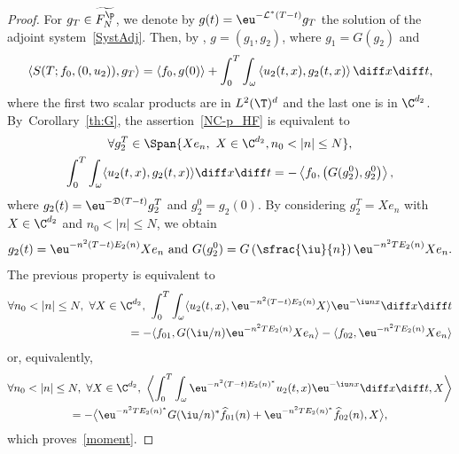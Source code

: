 \begin{proof}
For $g_T \in \widetilde{F^\p_N}$, we denote by $g(t)=\eu^{-\mathcal{L}^*(T-t)}g_T$ the solution of the adjoint system~\eqref{SystAdj}. Then, by , $g=(g_1,g_2)$, where $g_1=G(g_2)$ and
\[
\left\langle S(T;f_0,(0,u_2)), g_T \right\rangle = \left\langle f_0, g(0) \right\rangle + \int_0^T \int_{\omega} \left\langle u_2(t,x), g_2(t,x) \right\rangle \diff x \diff t,
\]
where the first two scalar products are in $L^2(\T)^{d}$ and the last one is in $\C^{d_2}$.
By~Corollary~\ref{th:G}, the assertion~\eqref{NC-p_HF} is equivalent to
\begin{multline}
\forall g_{2}^T \in \Span\{X e_n,\ X\in\C^{d_2}, n_0<|n|\leq N\},\\
\int_0^T \int_{\omega} \langle u_2(t,x), g_2(t,x) \rangle \diff x \diff t = -
\left\langle f_0, \left(G(g_2^0),g_2^0\right) \right\rangle,\end{multline}
where $g_2(t)=\eu^{-\mathfrak{D}(T-t)} g_2^T$ and $g_2^0=g_2(0)$.
By considering $g_2^T = X e_n$ with $X \in \C^{d_2}$ and $n_0 < |n|\leq N$, we obtain
\[
g_2(t)=\eu^{-n^2(T-t)E_2(n)} X e_n \text{ and }
G(g_2^0)=G\left(\sfrac{\iu}{n}\right)\eu^{-n^2 T E_2(n)} X e_n.
\]
The previous property is equivalent to
\begin{align*}
\forall n_0 < |n|\leq N,\ \forall X \in \C^{d_2}, \
\int_0^T \int_{\omega} \langle u_2(t,x), \eu^{-n^2(T-t)E_2(n)} X \rangle \eu^{-\iu nx} \diff x \diff t \\
= -
\langle f_{01}, G(\iu /n)\eu^{-n^2 T E_2(n)} X e_n \rangle - \langle f_{02}, \eu^{-n^2 T E_2(n)} X e_n \rangle
\end{align*}
or, equivalently,
\begin{multline*}
\forall n_0 < |n|\leq N,\ \forall X \in \C^{d_2}, \
\biggl\langle \int_0^T \int_{\omega} \eu^{-n^2(T-t)E_2(n)^*} u_2(t,x) \eu^{-\iu nx} \diff x \diff t, X \biggr\rangle\\
= -
\bigl\langle \eu^{-n^2 T E_2(n)^*} G(\iu /n)^* \widehat{f}_{01}(n) + \eu^{-n^2 T E_2(n)^*} \widehat{f}_{02}(n), X \bigr\rangle,
\end{multline*}
which proves~\eqref{moment}.


\end{proof}
